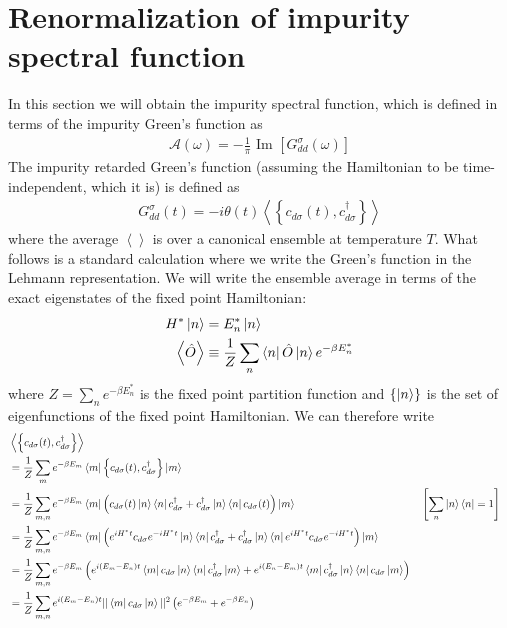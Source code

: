 \documentclass[twoside,11pt]{report}
\numberwithin{equation}{section}
\begin{document}
\section{Renormalization of impurity spectral function}
In this section we will obtain the impurity spectral function, which is defined in terms of the impurity Green's function as
\begin{equation}\begin{aligned}
	\mathcal{A(\omega)} = -\frac{1}{\pi}\text{ Im }\left[G_{dd}^\sigma\left( \omega \right) \right] 
\end{aligned}\end{equation}
The impurity retarded Green's function (assuming the Hamiltonian to be time-independent, which it is) is defined as
\begin{equation}\begin{aligned}
	G_{dd}^\sigma(t) = -i\theta(t) \left<\left\{ c_{d\sigma}(t),c^\dagger_{d\sigma} \right\}  \right>
\end{aligned}\end{equation}
where the average \(\left< \right>\) is over a canonical ensemble at temperature \(T\). What follows is a standard calculation where we write the Green's function in the Lehmann representation. We will write the ensemble average in terms of the exact eigenstates of the fixed point Hamiltonian:
\begin{equation}\begin{aligned}
	H^* \ket{n} &= E_n^* \ket{n}\\
	\left<\hat O \right> &\equiv \frac{1}{Z}\sum_n \bra{n} \hat O \ket{n} e^{-\beta E_n^*}
\end{aligned}\end{equation}
where \(Z = \sum_n e^{-\beta E_n^*}\) is the fixed point partition function and \(\left\{ \ket{n} \right\} \) is the set of eigenfunctions of the fixed point Hamiltonian. We can therefore write
\begin{equation}\begin{aligned}
	&\left<\left\{ c_{d\sigma}(t),c^\dagger_{d\sigma} \right\}  \right> \\
	&= \frac{1}{Z}\sum_{m}e^{-\beta E_m}\bra{m}\left\{ c_{d\sigma}(t),c^\dagger_{d\sigma} \right\} \ket{m}\\
	&= \frac{1}{Z}\sum_{m,n}e^{-\beta E_m}\bra{m}\left( c_{d\sigma}(t)\ket{n}\bra{n}c^\dagger_{d\sigma} + c^\dagger_{d\sigma}\ket{n}\bra{n}c_{d\sigma}(t)\right) \ket{m} && \left[\sum_n \ket{n}\bra{n} = 1\right]  \\
	&= \frac{1}{Z}\sum_{m,n}e^{-\beta E_m}\bra{m}\left( e^{iH^* t}c_{d\sigma}e^{-iH^* t}\ket{n}\bra{n}c^\dagger_{d\sigma} + c^\dagger_{d\sigma}\ket{n}\bra{n}e^{iH^* t}c_{d\sigma}e^{-iH^* t}\right) \ket{m}\\
	&= \frac{1}{Z}\sum_{m,n}e^{-\beta E_m}\left( e^{i\left( E_m - E_n \right)  t}\bra{m}c_{d\sigma}\ket{n}\bra{n}c^\dagger_{d\sigma} \ket{m} + e^{i\left( E_n - E_m \right)  t}\bra{m}c^\dagger_{d\sigma}\ket{n}\bra{n}c_{d\sigma} \ket{m}\right)\\
	&= \frac{1}{Z}\sum_{m,n}e^{i\left( E_m - E_n \right)  t}||\bra{m}c_{d\sigma}\ket{n}||^2\left( e^{-\beta E_m} + e^{-\beta E_n}\right)\\
\end{aligned}\end{equation}
\end{document}
